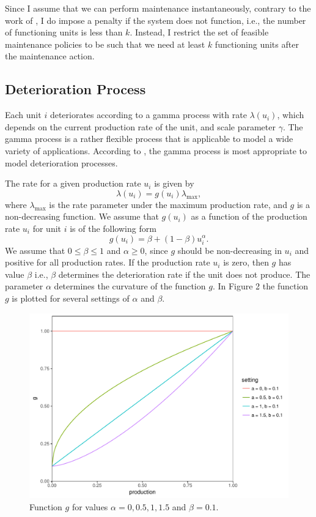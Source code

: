 \documentclass[a4paper,12pt]{article}
\begin{document}
Since I assume that we can perform maintenance instantaneously, contrary to the work of \cite{OLDEKEIZER2018319}, I do impose a penalty if the system does not function, i.e., the number of functioning units is less than $k$. Instead, I restrict the set of feasible maintenance policies to be such that we need at least $k$ functioning units after the maintenance action.


\subsection{Deterioration Process}
Each unit $i$ deteriorates according to a gamma process with rate $\lambda(u_i)$, which depends on the current production rate of the unit, and scale parameter $\gamma$. The gamma process is a rather flexible process that is applicable to model a wide variety of applications. According to \cite{van2009survey}, the gamma process is most appropriate to model deterioration processes. 

The rate for a given production rate $u_i$ is given by
$$
\lambda(u_i) = g(u_i) \lambda_{\text{max}},
$$
where $\lambda_{\text{max}}$ is the rate parameter under the maximum production rate, and $g$ is a non-decreasing function. We assume that $g(u_i)$ as a function of the production rate $u_i$ for unit $i$ is of the following form
$$
g(u_i) = \beta + (1-\beta)u_i^\alpha.
$$
We assume that $0 \leq \beta \leq 1$ and $\alpha \geq 0$, since $g$ should be non-decreasing in $u_i$ and positive for all production rates. If the production rate $u_i$ is zero, then $g$ has value $\beta$ i.e., $\beta$ determines the deterioration rate if the unit does not produce.  The parameter $\alpha$ determines the curvature of the function $g$. In Figure 2 the function $g$ is plotted for several settings of $\alpha$ and $\beta$. 

\begin{figure}[H]
	\centering
	\includegraphics[width=0.5\linewidth]{figures/g}
	\caption{Function $g$ for values $\alpha = 0, 0.5, 1, 1.5$ and $\beta = 0.1$.}
\end{figure}
\end{document}
